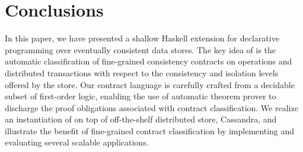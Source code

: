 \section{Conclusions}
\label{sec:concl}

In this paper, we have presented \name a shallow Haskell extension for
declarative programming over eventually consistent data stores. The key idea of
\name is the automatic classification of fine-grained consistency contracts on
operations and distributed transactions with respect to the consistency and
isolation levels offered by the store. Our contract language is carefully
crafted from a decidable subset of first-order logic, enabling the use of
automatic theorem prover to discharge the proof obligations associated with
contract classification. We realize an instantiation of \name on top of
off-the-shelf distributed store, Cassandra, and illustrate the benefit of
fine-grained contract classification by implementing and evaluating several
scalable applications.
